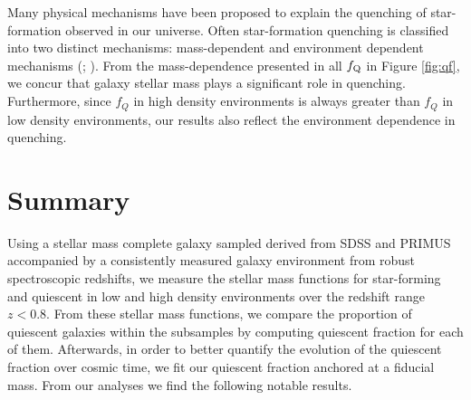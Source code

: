 \documentclass{emulateapj}
\begin{document}
Many physical mechanisms have been proposed to explain the quenching of star-formation observed in our universe. Often star-formation quenching is classified into two distinct mechanisms: mass-dependent and environment dependent mechanisms (\cite{Baldry:2006aa}; \cite{Peng:2010aa}). From the mass-dependence presented in all $f_{\rm{Q}}$ in Figure \ref{fig:qf}, we concur that galaxy stellar mass plays a significant role in quenching. Furthermore, since $f_Q$ in high density environments is always greater than $f_Q$ in low density environments, our results also reflect the environment dependence in quenching. %

\section{Summary} \label{sec:summary}
Using a stellar mass complete galaxy sampled derived from SDSS and PRIMUS accompanied by a consistently measured galaxy environment from robust spectroscopic redshifts, we measure the stellar mass functions for star-forming and quiescent in low and high density environments over the redshift range $z < 0.8$. From these stellar mass functions, we compare the proportion of quiescent galaxies within the subsamples by computing quiescent fraction for each of them. Afterwards, in order to better quantify the evolution of the quiescent fraction over cosmic time, we fit our quiescent fraction anchored at a fiducial mass. From our analyses we find the following notable results. 
\end{document}
